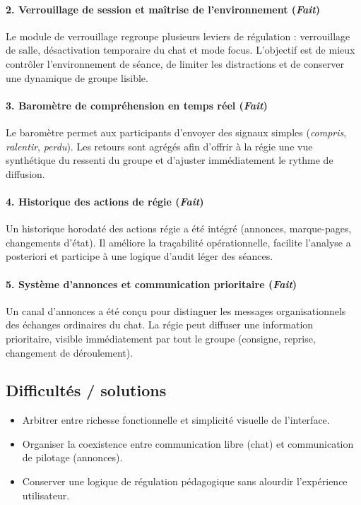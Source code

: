 \documentclass[11pt,a4paper]{report}
\begin{document}
\paragraph{2. Verrouillage de session et maîtrise de l'environnement (\textit{Fait})}
Le module de verrouillage regroupe plusieurs leviers de régulation : verrouillage de salle, désactivation temporaire du chat et mode focus. L'objectif est de mieux contrôler l'environnement de séance, de limiter les distractions et de conserver une dynamique de groupe lisible.

\paragraph{3. Baromètre de compréhension en temps réel (\textit{Fait})}
Le baromètre permet aux participants d'envoyer des signaux simples (\textit{compris}, \textit{ralentir}, \textit{perdu}). Les retours sont agrégés afin d'offrir à la régie une vue synthétique du ressenti du groupe et d'ajuster immédiatement le rythme de diffusion.

\paragraph{4. Historique des actions de régie (\textit{Fait})}
Un historique horodaté des actions régie a été intégré (annonces, marque-pages, changements d'état). Il améliore la traçabilité opérationnelle, facilite l'analyse a posteriori et participe à une logique d'audit léger des séances.

\paragraph{5. Système d'annonces et communication prioritaire (\textit{Fait})}
Un canal d'annonces a été conçu pour distinguer les messages organisationnels des échanges ordinaires du chat. La régie peut diffuser une information prioritaire, visible immédiatement par tout le groupe (consigne, reprise, changement de déroulement).
\subsection{Difficultés / solutions}
\begin{itemize}
    \item Arbitrer entre richesse fonctionnelle et simplicité visuelle de l'interface.
    \item Organiser la coexistence entre communication libre (chat) et communication de pilotage (annonces).
    \item Conserver une logique de régulation pédagogique sans alourdir l'expérience utilisateur.
\end{itemize}
\end{document}
